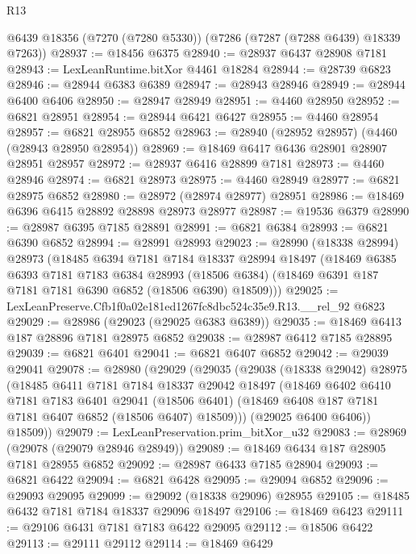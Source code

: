 \begin{lexlean}{R13}
\begin{coremodule}
    @6439
    @18356
    (@7270 (@7280 @5330))
    (@7286 (@7287 (@7288 @6439) @18339 @7263))
@28937 := @18456 @6375
@28940 := @28937 @6437 @28908 @7181
@28943 := LexLeanRuntime.bitXor @4461 @18284
@28944 := @28739 @6823
@28946 := @28944 @6383 @6389
@28947 := @28943 @28946
@28949 := @28944 @6400 @6406
@28950 := @28947 @28949
@28951 := @4460 @28950
@28952 := @6821 @28951
@28954 := @28944 @6421 @6427
@28955 := @4460 @28954
@28957 := @6821 @28955 @6852
@28963 := @28940 (@28952 @28957) (@4460 (@28943 @28950 @28954))
@28969 := @18469 @6417 @6436 @28901 @28907 @28951 @28957
@28972 := @28937 @6416 @28899 @7181
@28973 := @4460 @28946
@28974 := @6821 @28973
@28975 := @4460 @28949
@28977 := @6821 @28975 @6852
@28980 := @28972 (@28974 @28977) @28951
@28986 := @18469 @6396 @6415 @28892 @28898 @28973 @28977
@28987 := @19536 @6379
@28990 := @28987 @6395 @7185 @28891
@28991 := @6821 @6384
@28993 := @6821 @6390 @6852
@28994 := @28991 @28993
@29023 := @28990
    (@18338 @28994)
    @28973
    (@18485
      @6394
      @7181
      @7184
      @18337
      @28994
      @18497
      (@18469
        @6385
        @6393
        @7181
        @7183
        @6384
        @28993
        (@18506 @6384)
        (@18469 @6391 @187 @7181 @7181 @6390 @6852 (@18506 @6390) @18509)))
@29025 := LexLeanPreserve.Cfb1f0a02e181ed1267fc8dbc524c35e9.R13.__rel_92 @6823
@29029 := @28986 (@29023 (@29025 @6383 @6389))
@29035 := @18469 @6413 @187 @28896 @7181 @28975 @6852
@29038 := @28987 @6412 @7185 @28895
@29039 := @6821 @6401
@29041 := @6821 @6407 @6852
@29042 := @29039 @29041
@29078 := @28980
    (@29029
      (@29035
        (@29038
          (@18338 @29042)
          @28975
          (@18485
            @6411
            @7181
            @7184
            @18337
            @29042
            @18497
            (@18469
              @6402
              @6410
              @7181
              @7183
              @6401
              @29041
              (@18506 @6401)
              (@18469 @6408 @187 @7181 @7181 @6407 @6852 (@18506 @6407) @18509)))
          (@29025 @6400 @6406))
        @18509))
@29079 := LexLeanPreservation.prim_bitXor_u32
@29083 := @28969 (@29078 (@29079 @28946 @28949))
@29089 := @18469 @6434 @187 @28905 @7181 @28955 @6852
@29092 := @28987 @6433 @7185 @28904
@29093 := @6821 @6422
@29094 := @6821 @6428
@29095 := @29094 @6852
@29096 := @29093 @29095
@29099 := @29092 (@18338 @29096) @28955
@29105 := @18485 @6432 @7181 @7184 @18337 @29096 @18497
@29106 := @18469 @6423
@29111 := @29106 @6431 @7181 @7183 @6422 @29095
@29112 := @18506 @6422
@29113 := @29111 @29112
@29114 := @18469 @6429

\end{coremodule}
\end{lexlean}
